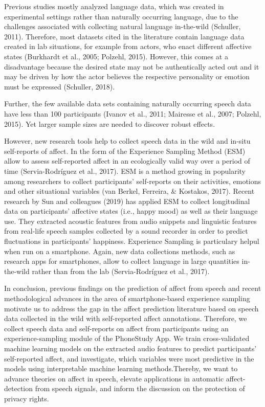 \documentclass[english,man]{apa6}
\begin{document}
Previous studies mostly analyzed language data, which was created in experimental settings rather than naturally occurring language, due to the challenges associated with collecting natural language in-the-wild (Schuller, 2011). Therefore, most datasets cited in the literature contain language data created in lab situations, for example from actors, who enact different affective states (Burkhardt et al., 2005; Polzehl, 2015). However, this comes at a disadvantage because the desired state may not be authentically acted out and it may be driven by how the actor believes the respective personality or emotion must be expressed (Schuller, 2018).

Further, the few available data sets containing naturally occurring speech data have less than 100 participants (Ivanov et al., 2011; Mairesse et al., 2007; Polzehl, 2015). Yet larger sample sizes are needed to discover robust effects.

However, new research tools help to collect speech data in the wild and in-situ self-reports of affect.
In the form of the Experience Sampling Method (ESM) allow to assess self-reported affect in an ecologically valid way over a period of time (Servia-Rodríguez et al., 2017). ESM is a method growing in popularity among researchers to collect participants' self-reports on their activities, emotions and other situational variables (van Berkel, Ferreira, \& Kostakos, 2017). Recent research by Sun and colleagues (2019) has applied ESM to collect longitudinal data on participants' affective states (i.e., happy mood) as well as their language use. They extracted acoustic features from audio snippets and linguistic features from real-life speech samples collected by a sound recorder in order to predict fluctuations in participants' happiness.
Experience Sampling is particulary helpul when run on a smartphone. Again, new data collections methods, such as research apps for smartphones, allow to collect language in large quantities in-the-wild rather than from the lab (Servia-Rodríguez et al., 2017).

In conclusion, previous findings on the prediction of affect from speech and recent methodological advances in the area of smartphone-based experience sampling motivate us to address the gap in the affect prediction literature based on speech data collected in the wild with self-reported affect annotations. Therefore, we collect speech data and self-reports on affect from participants using an experience-sampling module of the PhoneStudy App. We train cross-validated machine learning models on the extracted audio features to predict participants' self-reported affect, and investigate, which variables were most predictive in the models using interpretable machine learning methods.Thereby, we want to advance theories on affect in speech, elevate applications in automatic affect-detection from speech signals, and inform the discussion on the protection of privacy rights.
\end{document}
